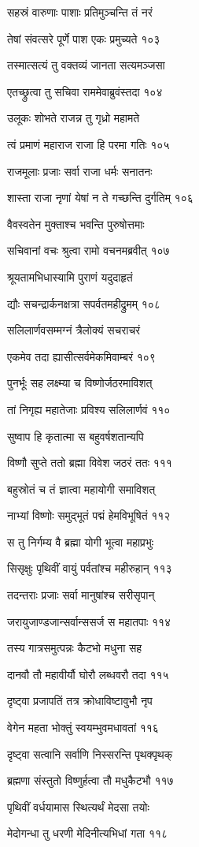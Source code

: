 सहस्रं वारुणाः पाशाः प्रतिमुञ्चन्ति तं नरं

तेषां संवत्सरे पूर्णे पाश एकः प्रमुच्यते १०३

तस्मात्सत्यं तु वक्तव्यं जानता सत्यमञ्जसा

एतच्छ्रुत्वा तु सचिवा राममेवाब्रुवंस्तदा १०४

उलूकः शोभते राजन्न तु गृध्रो महामते

त्वं प्रमाणं महाराज राजा हि परमा गतिः १०५

राजमूलाः प्रजाः सर्वा राजा धर्मः सनातनः

शास्ता राजा नृणां येषां न ते गच्छन्ति दुर्गतिम् १०६

वैवस्वतेन मुक्ताश्च भवन्ति पुरुषोत्तमाः

सचिवानां वचः श्रुत्वा रामो वचनमब्रवीत् १०७

श्रूयतामभिधास्यामि पुराणं यदुदाहृतं

द्यौः सचन्द्रार्कनक्षत्रा सपर्वतमहीद्रुमम् १०८

सलिलार्णवसम्मग्नं त्रैलोक्यं सचराचरं

एकमेव तदा ह्यासीत्सर्वमेकमिवाम्बरं १०९

पुनर्भूः सह लक्ष्म्या च विष्णोर्जठरमाविशत्

तां निगृह्य महातेजाः प्रविश्य सलिलार्णवं ११०

सुष्वाप हि कृतात्मा स बहुवर्षशतान्यपि

विष्णौ सुप्ते ततो ब्रह्मा विवेश जठरं ततः १११

बहुस्रोतं च तं ज्ञात्वा महायोगी समाविशत्

नाभ्यां विष्णोः समुद्भूतं पद्मं हेमविभूषितं ११२

स तु निर्गम्य वै ब्रह्मा योगी भूत्वा महाप्रभुः

सिसृक्षुः पृथिवीं वायुं पर्वतांश्च महीरुहान् ११३

तदन्तराः प्रजाः सर्वा मानुषांश्च सरीसृपान्

जरायुजाण्डजान्सर्वान्ससर्ज स महातपाः ११४

तस्य गात्रसमुत्पन्नः कैटभो मधुना सह

दानवौ तौ महावीर्यौ घोरौ लब्धवरौ तदा ११५

दृष्ट्वा प्रजापतिं तत्र क्रोधाविष्टावुभौ नृप

वेगेन महता भोक्तुं स्वयम्भुवमधावतां ११६

दृष्ट्वा सत्वानि सर्वाणि निस्सरन्ति पृथक्पृथक्

ब्रह्मणा संस्तुतो विष्णुर्हत्वा तौ मधुकैटभौ ११७

पृथिवीं वर्धयामास स्थित्यर्थं मेदसा तयोः

मेदोगन्धा तु धरणी मेदिनीत्यभिधां गता ११८

